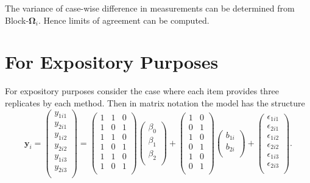 \documentclass[12pt, a4paper]{report}
\theoremstyle{plain}
\theoremstyle{definition}
\theoremstyle{remark}
\begin{document}
The variance of case-wise difference in measurements can be determined from Block-$\boldsymbol{\Omega}_{i}$. Hence limits of agreement can be computed.


\section{For Expository Purposes}



For expository purposes consider the case where each item provides three replicates by each method. Then in matrix notation the model has the structure
\[
\boldsymbol{y}_{i} =
\left(
\begin{array}{c}
y_{1i1} \\
y_{2i1} \\
y_{1i2} \\
y_{2i2} \\
y_{1i3} \\
y_{2i3} \\
\end{array}
\right) = 
\left(
\begin{array}{ccc}
1 & 1 & 0 \\
1 & 0 & 1 \\
1 & 1 & 0 \\
1 & 0 & 1 \\
1 & 1 & 0 \\
1 & 0 & 1 \\
\end{array}
\right)
\left(
\begin{array}{c}
\beta_0 \\ \beta_1 \\ \beta_2 \\
\end{array}
\right)
+
\left(
\begin{array}{cc}
1 & 0 \\
0 & 1 \\
1 & 0 \\
0 & 1 \\
1 & 0 \\
0 & 1 \\
\end{array}
\right)\left(
\begin{array}{c}
b_{1i} \\   b_{2i} \\
\end{array}
\right)
+
\left(
\begin{array}{c}
\epsilon_{1i1} \\
\epsilon_{2i1} \\
\epsilon_{1i2} \\
\epsilon_{2i2} \\
\epsilon_{1i3} \\
\epsilon_{2i3} \\
\end{array}
\right).
\]
\end{document}

